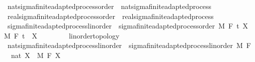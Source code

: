 \begin{isabellebody}
\isanewline
{}\isamarkupfalse%
\ nat{\isacharunderscore}{\kern0pt}sigma{\isacharunderscore}{\kern0pt}finite{\isacharunderscore}{\kern0pt}adapted{\isacharunderscore}{\kern0pt}process{\isacharunderscore}{\kern0pt}order\ {\isasymsubseteq}\ nat{\isacharunderscore}{\kern0pt}sigma{\isacharunderscore}{\kern0pt}finite{\isacharunderscore}{\kern0pt}adapted{\isacharunderscore}{\kern0pt}process%
\isadelimproof
\ %
\endisadelimproof
%
\isatagproof
\isacommand{{\isachardot}{\kern0pt}{\isachardot}{\kern0pt}}\isamarkupfalse%
%
\endisatagproof
{\isafoldproof}%
%
\isadelimproof
%
\endisadelimproof
\isanewline
{}\isamarkupfalse%
\ real{\isacharunderscore}{\kern0pt}sigma{\isacharunderscore}{\kern0pt}finite{\isacharunderscore}{\kern0pt}adapted{\isacharunderscore}{\kern0pt}process{\isacharunderscore}{\kern0pt}order\ {\isasymsubseteq}\ real{\isacharunderscore}{\kern0pt}sigma{\isacharunderscore}{\kern0pt}finite{\isacharunderscore}{\kern0pt}adapted{\isacharunderscore}{\kern0pt}process%
\isadelimproof
\ %
\endisadelimproof
%
\isatagproof
\isacommand{{\isachardot}{\kern0pt}{\isachardot}{\kern0pt}}\isamarkupfalse%
%
\endisatagproof
{\isafoldproof}%
%
\isadelimproof
%
\endisadelimproof
\isanewline
\isanewline
{}\isamarkupfalse%
\ sigma{\isacharunderscore}{\kern0pt}finite{\isacharunderscore}{\kern0pt}adapted{\isacharunderscore}{\kern0pt}process{\isacharunderscore}{\kern0pt}linorder\ {\isacharequal}{\kern0pt}\ sigma{\isacharunderscore}{\kern0pt}finite{\isacharunderscore}{\kern0pt}adapted{\isacharunderscore}{\kern0pt}process{\isacharunderscore}{\kern0pt}order\ M\ F\ t\ X\ \ M\ F\ t\ \ X\ {\isacharcolon}{\kern0pt}{\isacharcolon}{\kern0pt}\ {\isachardoublequoteopen}{\isacharunderscore}{\kern0pt}\ \ {\isasymRightarrow}\ {\isacharunderscore}{\kern0pt}\ {\isasymRightarrow}\ {\isacharunderscore}{\kern0pt}\ {\isacharcolon}{\kern0pt}{\isacharcolon}{\kern0pt}\ {\isacharbraceleft}{\kern0pt}linorder{\isacharunderscore}{\kern0pt}topology{\isacharbraceright}{\kern0pt}{\isachardoublequoteclose}\isanewline
\isanewline
{}\isamarkupfalse%
\ nat{\isacharunderscore}{\kern0pt}sigma{\isacharunderscore}{\kern0pt}finite{\isacharunderscore}{\kern0pt}adapted{\isacharunderscore}{\kern0pt}process{\isacharunderscore}{\kern0pt}linorder\ {\isacharequal}{\kern0pt}\ sigma{\isacharunderscore}{\kern0pt}finite{\isacharunderscore}{\kern0pt}adapted{\isacharunderscore}{\kern0pt}process{\isacharunderscore}{\kern0pt}linorder\ M\ F\ {\isachardoublequoteopen}{}\ {\isacharcolon}{\kern0pt}{\isacharcolon}{\kern0pt}\ nat{\isachardoublequoteclose}\ X\ \ M\ F\ X\isanewline

\end{isabellebody}
